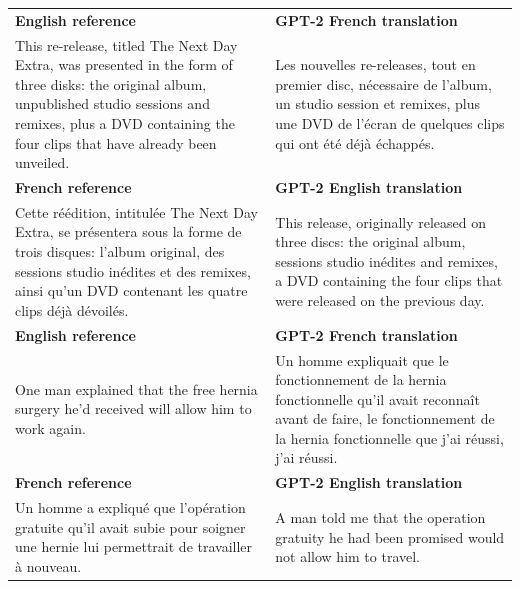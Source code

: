 \documentclass{article}
\begin{document}
{\renewcommand{\arraystretch}{2}%
\begin{table}[t]
\begin{center}
\begin{tabular}{|p{8cm}|p{8cm}|}
\hline
 \textbf{English reference} & \textbf{GPT-2 French translation} \\
 This re-release, titled The Next Day Extra, was presented in the form of three disks: the original album, unpublished studio sessions and remixes, plus a DVD containing the four clips that have already been unveiled. & Les nouvelles re-releases, tout en premier disc, nécessaire de l'album, un studio session et remixes, plus une DVD de l'écran de quelques clips qui ont été déjà échappés. \\

 \hline

\textbf{French reference} & \textbf{GPT-2 English translation}  \\

Cette réédition, intitulée The Next Day Extra, se présentera sous la forme de trois disques: l'album original, des sessions studio inédites et des remixes, ainsi qu'un DVD contenant les quatre clips déjà dévoilés. & This release, originally released on three discs: the original album, sessions studio inédites and remixes, a DVD containing the four clips that were released on the previous day. \\

\hline
\hline

 \textbf{English reference} & \textbf{GPT-2 French translation} \\
One man explained that the free hernia surgery he'd received will allow him to work again. & Un homme expliquait que le fonctionnement de la hernia fonctionnelle qu'il avait reconnaît avant de faire, le fonctionnement de la hernia fonctionnelle que j'ai réussi, j'ai réussi. \\
 \hline



\textbf{French reference} & \textbf{GPT-2 English translation}  \\
Un homme a expliqué que l'opération gratuite qu'il avait subie pour soigner une hernie lui permettrait de travailler à nouveau.
& A man told me that the operation gratuity he had been promised would not allow him to travel. \\


\end{tabular}
\end{center}
\end{table}}
\end{document}

